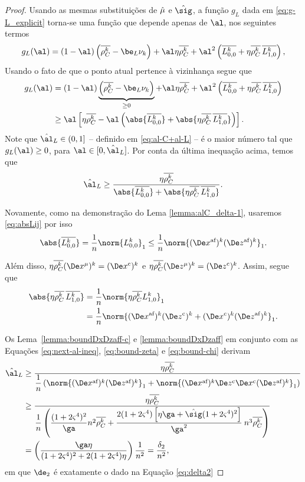 \begin{proof}

Usando as mesmas substituições de $\hat{\mu}$ e $\nextsig$, a função $g_L$ dada em \eqref{eq:g-L_explicit} torna-se uma função que depende apenas de $\al$, nos seguintes termos 
\[
g_L(\al) =     (1-\al)\left(\rhoCkb  -  \be_L \nuk    \right) +  \al\eta\rhoCkb  + 
   \al^2\left( \dbvec{L_{0,0}^{k}} + \eta\rhoCkb   \,\dbvec{L_{1,0}^{k}}   \right ) ,
	\]
Usando  o fato de que o ponto atual pertence à  vizinhança segue que 
 \[
\begin{aligned}
{g}_L(\al) & =     (1-\al)\underbrace{\left(\rhoCkb  -  \be_L \nuk    \right)}_{\geq 0} +  \al\eta\rhoCkb  + 
   \al^2\left( \dbvec{L_{0,0}^{k}} + \eta\rhoCkb  \, \dbvec{L_{1,0}^{k}}   \right ) \\
   & \geq  \al\left[\eta\rhoCkb  - 
   \al \left(\abs{\dbvec{L_{0,0}^{k}}} + \abs{\eta\rhoCkb\,  \dbvec{L_{1,0}^{k}}}\right)   \right ].
\end{aligned}
 \]
Note que  $\nextal_L\in(0,1]$ -- definido em \eqref{eq:al-C+al-L} -- é o maior número tal que  $g_L(\al)\geq 0$, para  $\al\in[0,\nextal_L]$. Por conta da última inequação acima, temos que 
\begin{equation}
	\label{eq:next-al-ineq}
\nextal_L \geq \frac{\eta\rhoCkb  }{\abs{\dbvec{L_{0,0}^{k}}} + \abs{\eta\rhoCkb \,  \dbvec{L_{1,0}^{k}}}}.
\end{equation}

Novamente, como na demonstração do Lema \ref{lemma:alC_delta-1}, usaremos \eqref{eq:absLij} por isso
\begin{equation}
\abs{\dbvec{L_{0,0}^{k}}}  = \frac{1}{n}\norm{L_{0,0}^{k}}_{1}  \leq \dfrac{1}{n} \norm{ \dekx  \dekz }_1 .  \label{eq:bound-zeta}
\end{equation}

Além disso,  $\eta\rhoCkb (\Dex^\mu)^{k} = \Dekcox $  e $  \eta\rhoCkb (\Dez^\mu)^{k} = \Dekcoz$.
Assim,  segue que
	\begin{align}
	\abs{\eta\rhoCkb \,  \dbvec{L_{1,0}^{k}}} & = \dfrac{1}{n}\norm{\eta\rhoCkb L_{1,0}^{k}}_{1}  \notag \\
	& =  \dfrac{1}{n} \norm{ \dekx \Dekcoz + \Dekcox \dekz }_1.\label{eq:bound-chi}
	\end{align}


Os Lema~\ref{lemma:boundDxDzaff-c} e  \ref{lemma:boundDxDzaff} em conjunto com  as Equações \eqref{eq:next-al-ineq}, \eqref{eq:bound-zeta} e \eqref{eq:bound-chi} derivam 
\[
\begin{aligned}
\nextal_L  & \geq \frac{\eta\rhoCkb  } {\dfrac{1}{n} \left(\norm{ \dekx  \dekz }_1 +  \norm{ \dekx \Decoz  \Decox \dekz }_1 \right) } \\
		   & \geq \dfrac{\eta\rhoCkb  } {\dfrac{1}{n} \left(\dfrac{(1 + 2\bdxzstar^{4})^{2} }{\ga} n^{2}\rhoCkb + \dfrac{2(1+2\bdxzstar^{4})\left[\eta\ga + \nextsig(1+2\bdxzstar^{4})^{2}\right]}{\ga^{2}}\: n^{3}\rhoCkb  \right) } \\
		   & = \left( \dfrac{\ga\eta } {(1 + 2\bdxzstar^{4})^{2}  + 2(1+2\bdxzstar^{4})\eta}\right) \dfrac{1}{n^{2}} = \frac{\delta_{2}}{n^{2}}, 
\end{aligned}
\]
em que $\de_{2}$ é exatamente o dado na Equação \eqref{eq:delta2}
\end{proof}
 
